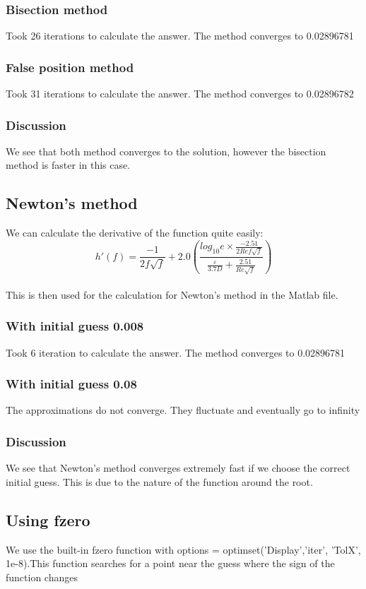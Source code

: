 \documentclass{article}
\begin{document}
    \subsubsection{Bisection method}
    Took 26 iterations to calculate the answer. The method converges to 0.02896781 
    \subsubsection{False position method}
    Took 31 iterations to calculate the answer. The method converges to 0.02896782
    \subsubsection{Discussion}
    We see that both method converges to the solution, however the bisection method is faster in this case.
    \subsection{Newton's method}
    We can calculate the derivative of the function quite easily: \\
    \[ h'(f) = \frac{-1}{2 f \sqrt{f}} + 2.0 \left(\frac{log_{10} e \times \frac{-2.51}{2 \textit{Re} f \sqrt{f}}}{\frac{\varepsilon}{3.7D} + \frac{2.51}{\textit{Re}\sqrt{f}}}\right) \]\\
    This is then used for the calculation for Newton's method in the Matlab file.
    \subsubsection{With initial guess 0.008}
    Took 6 iteration to calculate the answer. The method converges to 0.02896781 
    \subsubsection{With initial guess 0.08}
    The approximations do not converge. They fluctuate and eventually go to infinity
    \subsubsection{Discussion}
    We see that Newton's method converges extremely fast if we choose the correct initial guess. This is due to the nature of the function around the root.
    \subsection{Using fzero}
    We use the built-in fzero function with options = optimset('Display','iter', 'TolX', 1e-8).This function searches for a point near the guess where the sign of the function changes
\end{document}
